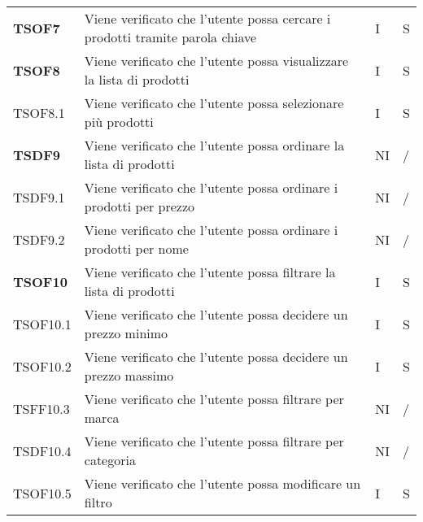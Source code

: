 \begin{center}
\begin{longtable}[!h]{p{60px} p{240px} p{35px} p{35px}}
        \textbf{TSOF7}  & Viene verificato che l'utente possa cercare i prodotti tramite parola chiave                                        & I              & S              \\
        \textbf{TSOF8}  & Viene verificato che l'utente possa visualizzare la lista di prodotti                                               & I              & S              \\
        TSOF8.1         & Viene verificato che l'utente possa selezionare più prodotti                                                        & I              & S              \\
        \textbf{TSDF9}  & Viene verificato che l'utente possa ordinare la lista di prodotti                                                   & NI             & /              \\
        TSDF9.1         & Viene verificato che l'utente possa ordinare i prodotti per prezzo                                                  & NI             & /              \\
        TSDF9.2         & Viene verificato che l'utente possa ordinare i prodotti per nome                                                    & NI             & /              \\
        \textbf{TSOF10} & Viene verificato che l'utente possa filtrare la lista di prodotti                                                   & I              & S              \\
        TSOF10.1        & Viene verificato che l'utente possa decidere un prezzo minimo                                                       & I              & S              \\
        TSOF10.2        & Viene verificato che l'utente possa decidere un prezzo massimo                                                      & I              & S              \\
        TSFF10.3        & Viene verificato che l'utente possa filtrare per marca                                                              & NI             & /              \\
        TSDF10.4        & Viene verificato che l'utente possa filtrare per categoria                                                          & NI             & /              \\
        TSOF10.5        & Viene verificato che l'utente possa modificare un filtro                                                            & I              & S              \\

\end{longtable}
\end{center}
